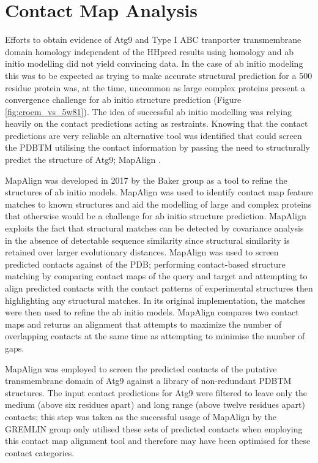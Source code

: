 \section{Contact Map Analysis}
Efforts to obtain evidence of Atg9 and Type I ABC tranporter transmembrane domain homology independent of the HHpred results using homology and ab initio modelling did not yield convincing data.  In the case of ab initio modeling this was to be expected as trying to make accurate structural prediction for a 500 residue protein was, at the time, uncommon as large complex proteins present a convergence challenge for ab initio structure prediction (Figure \ref{fig:croem_vs_5w81}). The idea of successful ab initio modelling was relying heavily on the contact predictions acting as restraints.  Knowing that the contact predictions are very reliable an alternative tool was identified that could screen the PDBTM utilising the contact information by passing the need to structurally predict the structure of Atg9; MapAlign \cite{Ovchinnikov2017}. 

MapAlign was developed in 2017 by the Baker group as a tool to refine the structures of ab initio models.  MapAlign was used to identify contact map feature matches to known structures and aid the modelling of large and complex proteins that otherwise would be a challenge for ab initio structure prediction. MapAlign exploits the fact that structural matches can be detected by covariance analysis in the absence of detectable sequence similarity since structural similarity is retained over larger evolutionary distances.  MapAlign was used to screen predicted contacts against of the PDB; performing contact-based structure matching by comparing contact maps of the query and target and attempting to align predicted contacts with the contact patterns of experimental structures then highlighting any structural matches. In its original implementation, the matches were then used to refine the ab initio models.  MapAlign compares two contact maps and returns an alignment that attempts to maximize the number of overlapping contacts at the same time as attempting to minimise the number of gaps.

MapAlign was employed to screen the predicted contacts of the putative transmembrane domain of Atg9 against a library of non-redundant PDBTM structures. The input contact predictions for Atg9 were filtered to leave only the medium (above six residues apart) and long range (above twelve residues apart) contacts; this step was taken as the successful usage of MapAlign by the GREMLIN group only utilised these sets of predicted contacts when employing this contact map alignment tool \cite{Ovchinnikov2017} and therefore may have been optimised for these contact categories. 

